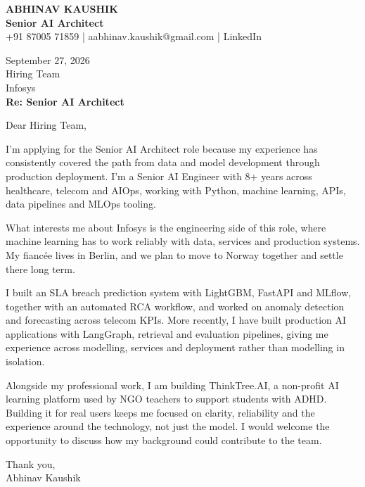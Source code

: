 \documentclass[10pt,a4paper]{article}
\begin{document}
\begin{center}
{\Large\bfseries ABHINAV KAUSHIK}\\[2pt]
{\bfseries Senior AI Architect}\\[2pt]
+91 87005 71859 \quad | \quad aabhinav.kaushik@gmail.com \quad | \quad LinkedIn
\end{center}
\vspace{8pt}
September 27, 2026\\[6pt]
Hiring Team\\
Infosys\\[4pt]
\textbf{Re: Senior AI Architect}

Dear Hiring Team,

I’m applying for the Senior AI Architect role because my experience has consistently covered the path from data and model development through production deployment. I’m a Senior AI Engineer with 8+ years across healthcare, telecom and AIOps, working with Python, machine learning, APIs, data pipelines and MLOps tooling.

What interests me about Infosys is the engineering side of this role, where machine learning has to work reliably with data, services and production systems. My fiancée lives in Berlin, and we plan to move to Norway together and settle there long term.

I built an SLA breach prediction system with LightGBM, FastAPI and MLflow, together with an automated RCA workflow, and worked on anomaly detection and forecasting across telecom KPIs. More recently, I have built production AI applications with LangGraph, retrieval and evaluation pipelines, giving me experience across modelling, services and deployment rather than modelling in isolation.

Alongside my professional work, I am building ThinkTree.AI, a non-profit AI learning platform used by NGO teachers to support students with ADHD. Building it for real users keeps me focused on clarity, reliability and the experience around the technology, not just the model. I would welcome the opportunity to discuss how my background could contribute to the team.

Thank you,\\
Abhinav Kaushik
\end{document}
